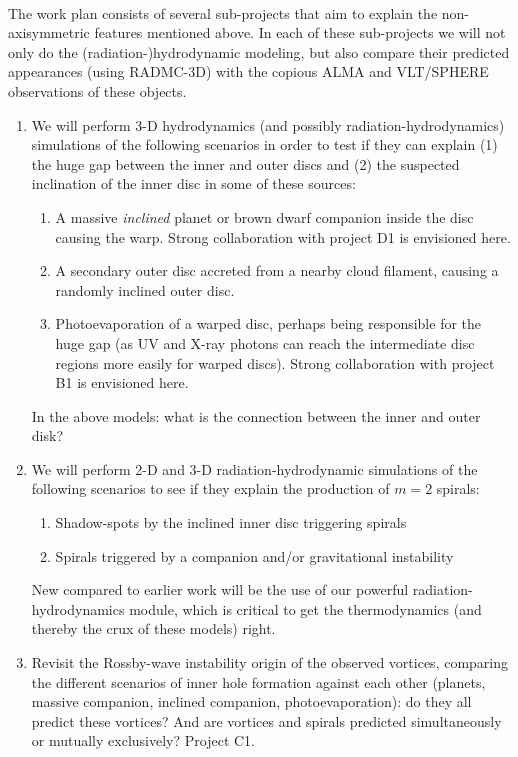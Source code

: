 \vspace{0.5em}
\\
%
The work plan consists of several sub-projects that aim to explain the
non-axisymmetric features mentioned above. In each of these sub-projects we
will not only do the (radiation-)hydrodynamic modeling, but also compare
their predicted appearances (using RADMC-3D) with the copious ALMA and
VLT/SPHERE observations of these objects.
\begin{enumerate}
\item We will perform 3-D hydrodynamics (and possibly
  radiation-hydrodynamics) simulations of the following scenarios in order
  to test if they can explain (1) the huge gap between the inner and outer
  discs and (2) the suspected inclination of the inner disc in some of these
  sources:
  \begin{enumerate}
  \item A massive {\em inclined} planet or brown dwarf companion inside the
    disc causing the warp. Strong collaboration with project D1 is
    envisioned here.
  \item A secondary outer disc accreted from a nearby cloud filament,
    causing a randomly inclined outer disc.
  \item Photoevaporation of a warped disc, perhaps being responsible for the
    huge gap (as UV and X-ray photons can reach the intermediate disc
    regions more easily for warped discs). Strong collaboration with
    project B1 is envisioned here.
  \end{enumerate}
In the above models: what is the connection between the inner and outer disk?
\item We will perform 2-D and 3-D radiation-hydrodynamic simulations of
  the following scenarios to see if they explain the production of
  $m=2$ spirals:
  \begin{enumerate}
    \item Shadow-spots by the inclined inner disc triggering spirals 
    \item Spirals triggered by a companion and/or gravitational instability
  \end{enumerate}
  New compared to earlier work will be the use of our powerful
  radiation-hydrodynamics module, which is critical to get the
  thermodynamics (and thereby the crux of these models) right.
\item Revisit the Rossby-wave instability origin of the observed vortices,
  comparing the different scenarios of inner hole formation against each
  other (planets, massive companion, inclined companion, photoevaporation):
  do they all predict these vortices? And are vortices and spirals predicted
  simultaneously or mutually exclusively? Project C1.
\end{enumerate}


